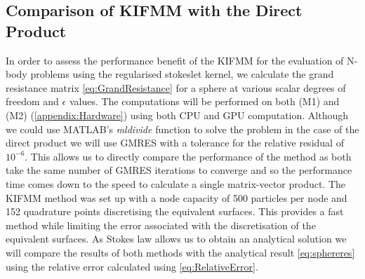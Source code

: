 \subsection{Comparison of KIFMM with the Direct Product}
In order to assess the performance benefit of the KIFMM for the evaluation of N-body problems using the regularised stokeslet kernel, we calculate the grand resistance matrix \cref{eq:GrandResistance} for a sphere at various scalar degrees of freedom and $\epsilon$ values. The computations will be performed on both (M1) and (M2) (\cref{appendix:Hardware}) using both CPU and GPU computation. Although we could use MATLAB's \textit{mldivide} function to solve the problem in the case of the direct product we will use GMRES with a tolerance for the relative residual of $10^{-6}$. This allows us to directly compare the performance of the method as both take the same number of GMRES iterations to converge and so the performance time comes down to the speed to calculate a single matrix-vector product. The KIFMM method was set up with a node capacity of 500 particles per node and 152 quadrature points discretising the equivalent surfaces. This provides a fast method while limiting the error associated with the discretisation of the equivalent surfaces. As Stokes law allows us to obtain an analytical solution we will compare the results of both methods with the analytical result \cref{eq:sphereres} using the relative error calculated using \cref{eq:RelativeError}.

